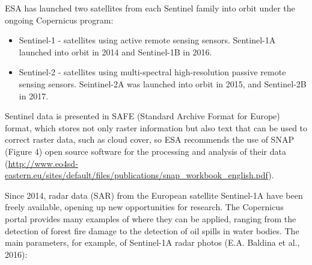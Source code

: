 	ESA has launched two satellites from each Sentinel family into orbit under the ongoing Copernicus program:
	
	\begin{itemize}
		\item Sentinel-1 - satellites using active remote sensing sensors. Sentinel-1A launched into orbit in 2014 and Sentinel-1B in 2016.
		\item Sentinel-2 - satellites using multi-spectral high-resolution passive remote sensing sensors. Seintinel-2A was launched into orbit in 2015, and Sentinel-2B in 2017.
	\end{itemize}

	Sentinel data is presented in SAFE (Standard Archive Format for Europe) format, which stores not only raster information but also text that can be used to correct raster data, such as cloud cover, so ESA recommends the use of SNAP (Figure 4) open source software for the processing and analysis of their data (\url{http://www.eo4sd-eastern.eu/sites/default/files/publications/snap_workbook_english.pdf}).
	
	Since 2014, radar data (SAR) from the European satellite Sentinel-1A have been freely available, opening up new opportunities for research. The Copernicus portal provides many examples of where they can be applied, ranging from the detection of forest fire damage to the detection of oil spills in water bodies. The main parameters, for example, of Sentinel-1A radar photos (E.A. Baldina et al., 2016):
	
